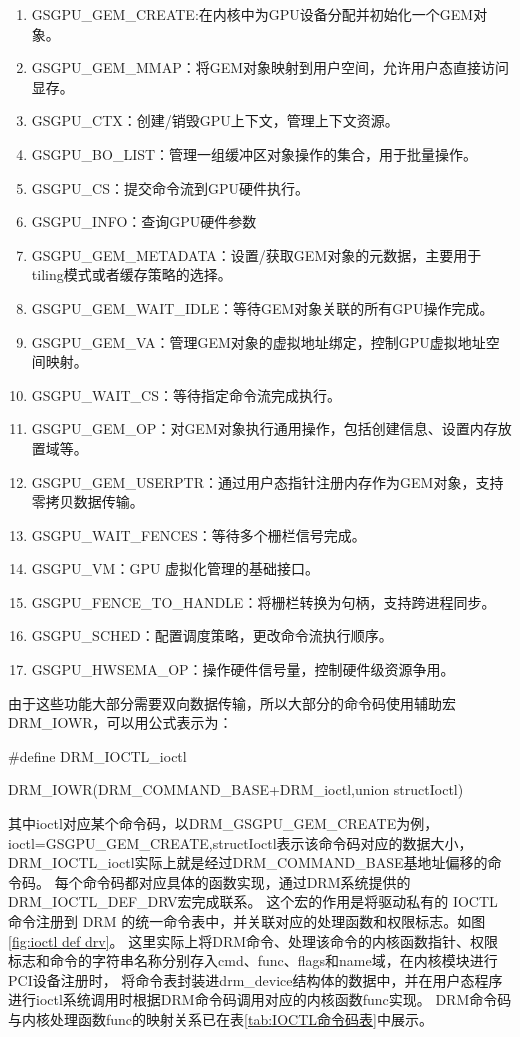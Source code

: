 \begin{enumerate}[1)]
  \item GSGPU\_GEM\_CREATE:在内核中为GPU设备分配并初始化一个GEM对象。
  \item GSGPU\_GEM\_MMAP：将GEM对象映射到用户空间，允许用户态直接访问显存。
  \item GSGPU\_CTX：创建/销毁GPU上下文，管理上下文资源。
  \item GSGPU\_BO\_LIST：管理一组缓冲区对象操作的集合，用于批量操作。
  \item GSGPU\_CS：提交命令流到GPU硬件执行。
  \item GSGPU\_INFO：查询GPU硬件参数
  \item GSGPU\_GEM\_METADATA：设置/获取GEM对象的元数据，主要用于tiling模式或者缓存策略的选择。
  \item GSGPU\_GEM\_WAIT\_IDLE：等待GEM对象关联的所有GPU操作完成。
  \item GSGPU\_GEM\_VA：管理GEM对象的虚拟地址绑定，控制GPU虚拟地址空间映射。
  \item GSGPU\_WAIT\_CS：等待指定命令流完成执行。
  \item GSGPU\_GEM\_OP：对GEM对象执行通用操作，包括创建信息、设置内存放置域等。
  \item GSGPU\_GEM\_USERPTR：通过用户态指针注册内存作为GEM对象，支持零拷贝数据传输。
  \item GSGPU\_WAIT\_FENCES：等待多个栅栏信号完成。
  \item GSGPU\_VM：GPU 虚拟化管理的基础接口。
  \item GSGPU\_FENCE\_TO\_HANDLE：将栅栏转换为句柄，支持跨进程同步。
  \item GSGPU\_SCHED：配置调度策略，更改命令流执行顺序。
  \item GSGPU\_HWSEMA\_OP：操作硬件信号量，控制硬件级资源争用。
\end{enumerate}
由于这些功能大部分需要双向数据传输，所以大部分的命令码使用辅助宏DRM\_IOWR，可以用公式表示为：

\#define DRM\_IOCTL\_ioctl

 DRM\_IOWR(DRM\_COMMAND\_BASE+DRM\_ioctl,union structIoctl)

其中ioctl对应某个命令码，以DRM\_GSGPU\_GEM\_CREATE为例，ioctl=GSGPU\_GEM\_CREATE,structIoctl表示该命令码对应的数据大小，
DRM\_IOCTL\_ioctl实际上就是经过DRM\_COMMAND\_BASE基地址偏移的命令码。
每个命令码都对应具体的函数实现，通过DRM系统提供的DRM\_IOCTL\_DEF\_DRV宏完成联系。
这个宏的作用是将驱动私有的 IOCTL 命令注册到 DRM 的统一命令表中，并关联对应的处理函数和权限标志。如图\ref{fig:ioctl def drv}。
这里实际上将DRM命令、处理该命令的内核函数指针、权限标志和命令的字符串名称分别存入cmd、func、flags和name域，在内核模块进行PCI设备注册时，
将命令表封装进drm\_device结构体的数据中，并在用户态程序进行ioctl系统调用时根据DRM命令码调用对应的内核函数func实现。
DRM命令码与内核处理函数func的映射关系已在表\ref{tab:IOCTL命令码表}中展示。

